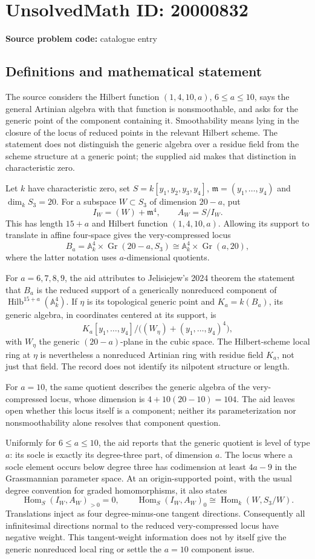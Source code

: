 \documentclass[11pt]{article}
\newcommand{\A}{\mathbb{A}}
\begin{document}
\section*{UnsolvedMath ID: 20000832}
\textbf{Source problem code:} catalogue entry
\subsection{Definitions and mathematical statement}
The source considers the Hilbert function $(1,4,10,a)$, $6\leq a\leq10$, says the general Artinian algebra with that function is nonsmoothable, and asks for the generic point of the component containing it. Smoothability means lying in the closure of the locus of reduced points in the relevant Hilbert scheme. The statement does not distinguish the generic algebra over a residue field from the scheme structure at a generic point; the supplied aid makes that distinction in characteristic zero.

Let $k$ have characteristic zero, set $S=k[y_1,y_2,y_3,y_4]$, $\mathfrak m=(y_1,\ldots,y_4)$ and $\dim_k S_3=20$. For a subspace $W\subset S_3$ of dimension $20-a$, put
\[
 I_W=(W)+\mathfrak m^4,\qquad A_W=S/I_W.
\]
This has length $15+a$ and Hilbert function $(1,4,10,a)$. Allowing its support to translate in affine four-space gives the very-compressed locus
\[
 B_a=\A^4_k\times\operatorname{Gr}(20-a,S_3)
 \cong\A^4_k\times\operatorname{Gr}(a,20),
\]
where the latter notation uses $a$-dimensional quotients.

For $a=6,7,8,9$, the aid attributes to Jelisiejew's 2024 theorem the statement that $B_a$ is the reduced support of a generically nonreduced component of $\operatorname{Hilb}^{15+a}(\A^4_k)$. If $\eta$ is its topological generic point and $K_a=k(B_a)$, its generic algebra, in coordinates centered at its support, is
\[
 K_a[y_1,\ldots,y_4]/\bigl((W_\eta)+(y_1,\ldots,y_4)^4\bigr),
\]
with $W_\eta$ the generic $(20-a)$-plane in the cubic space. The Hilbert-scheme local ring at $\eta$ is nevertheless a nonreduced Artinian ring with residue field $K_a$, not just that field. The record does not identify its nilpotent structure or length.

For $a=10$, the same quotient describes the generic algebra of the very-compressed locus, whose dimension is $4+10(20-10)=104$. The aid leaves open whether this locus itself is a component; neither its parameterization nor nonsmoothability alone resolves that component question.

Uniformly for $6\leq a\leq10$, the aid reports that the generic quotient is level of type $a$: its socle is exactly its degree-three part, of dimension $a$. The locus where a socle element occurs below degree three has codimension at least $4a-9$ in the Grassmannian parameter space. At an origin-supported point, with the usual degree convention for graded homomorphisms, it also states
\[
 \operatorname{Hom}_S(I_W,A_W)_{>0}=0,\qquad
 \operatorname{Hom}_S(I_W,A_W)_0
 \cong\operatorname{Hom}_k(W,S_3/W).
\]
Translations inject as four degree-minus-one tangent directions. Consequently all infinitesimal directions normal to the reduced very-compressed locus have negative weight. This tangent-weight information does not by itself give the generic nonreduced local ring or settle the $a=10$ component issue.
\end{document}
